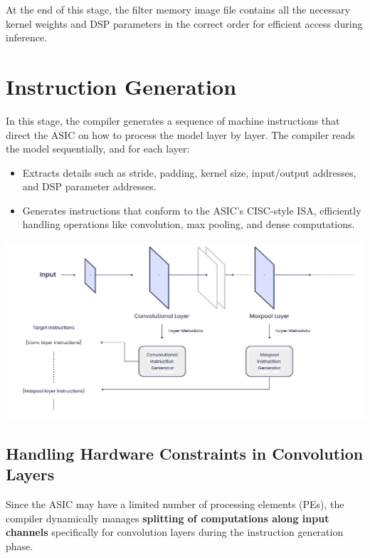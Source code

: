 \documentclass[12pt]{report}
\begin{document}
At the end of this stage, the filter memory image file contains all the necessary kernel weights and DSP parameters in the correct order for efficient access during inference.

\section{Instruction Generation}

In this stage, the compiler generates a sequence of machine instructions that direct the ASIC on how to process the model layer by layer. The compiler reads the model sequentially, and for each layer:
\begin{itemize}
    \item Extracts details such as stride, padding, kernel size, input/output addresses, and DSP parameter addresses.
    \item Generates instructions that conform to the ASIC’s CISC-style ISA, efficiently handling operations like convolution, max pooling, and dense computations.
\end{itemize}
\includegraphics[width=\textwidth]{instruction_generation1.png}

\subsection*{Handling Hardware Constraints in Convolution Layers}

Since the ASIC may have a limited number of processing elements (PEs), the compiler dynamically manages \textbf{splitting of computations along input channels} specifically for convolution layers during the instruction generation phase.
\end{document}
